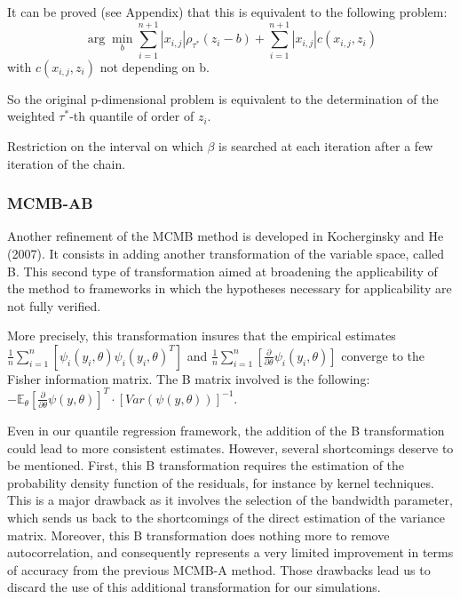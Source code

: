 \documentclass[11pt]{article}
\begin{document}
It can be proved (see Appendix) that this is equivalent to the following problem:
\begin{equation*}
\arg\min_{b} \sum_{i=1}^{n+1}|x_{i,j}|\rho_{\tau^{*}}(z_{i}-b) + \sum_{i=1}^{n+1}|x_{i,j}|c(x_{i,j}, z_{i})
\end{equation*}
with $c(x_{i,j}, z_{i})$ not depending on b.

So the original p-dimensional problem is equivalent to the determination of the weighted $\tau^{*}$-th quantile of order of $z_{i}$.

Restriction on the interval on which $\beta$ is searched at each iteration after a few iteration of the chain.




	\subsubsection{MCMB-AB}

Another refinement of the MCMB method is developed in Kocherginsky and He (2007). It consists in adding another transformation of the variable space, called B. This second type of transformation aimed at broadening the applicability of the method to frameworks in which the hypotheses necessary for applicability are not fully verified.\smallskip

More precisely, this transformation insures that the empirical estimates $\frac{1}{n} \sum_{i=1}^{n}[\psi_i(y_i,\theta)\psi_i(y_i,\theta)^T]$ and $\frac{1}{n} \sum_{i=1}^{n}[\frac{\partial}{\partial\theta}\psi_i(y_i,\theta)]$ converge to the Fisher information matrix. The B matrix involved is the following: $-\mathds{E}_{\theta}[\frac{\partial}{\partial\theta}\psi(y,\theta)]^T \cdot [Var(\psi(y,\theta))]^{-1}$.\smallskip

Even in our quantile regression framework, the addition of the B transformation could lead to more consistent estimates. However, several shortcomings deserve to be mentioned. First, this B transformation requires the estimation of the probability density function of the residuals, for instance by kernel techniques. This is a major drawback as it involves the selection of the bandwidth parameter, which sends us back to the shortcomings of the direct estimation of the variance matrix. Moreover, this B transformation does nothing more to remove autocorrelation, and consequently represents a very limited improvement in terms of accuracy from the previous MCMB-A method. Those drawbacks lead us to discard the use of this additional transformation for our simulations.\smallskip
\end{document}
